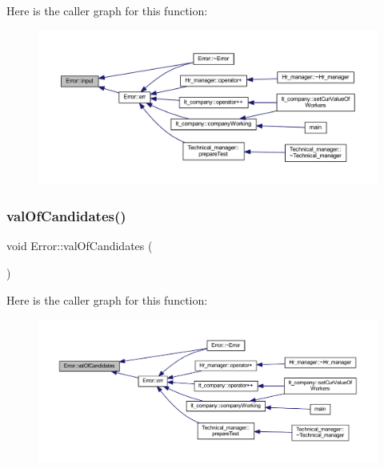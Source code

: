 Here is the caller graph for this function\+:
\nopagebreak
\begin{figure}[H]
\begin{center}
\leavevmode
\includegraphics[width=350pt]{class_error_a9f20c7656a23e4f4cf1fa600ced37421_icgraph}
\end{center}
\end{figure}
\hypertarget{class_error_a35ab6ad1cad16467c4817cdc8e3ebaea}{}\label{class_error_a35ab6ad1cad16467c4817cdc8e3ebaea} 
\subsubsection{\texorpdfstring{val\+Of\+Candidates()}{valOfCandidates()}}
{\footnotesize\ttfamily void Error\+::val\+Of\+Candidates (\begin{DoxyParamCaption}{ }\end{DoxyParamCaption})}

Here is the caller graph for this function\+:
\nopagebreak
\begin{figure}[H]
\begin{center}
\leavevmode
\includegraphics[width=350pt]{class_error_a35ab6ad1cad16467c4817cdc8e3ebaea_icgraph}
\end{center}
\end{figure}
\hypertarget{class_error_a5d7c6b97cda36f85a426dd2032c242d3}{}\label{class_error_a5d7c6b97cda36f85a426dd2032c242d3} 
